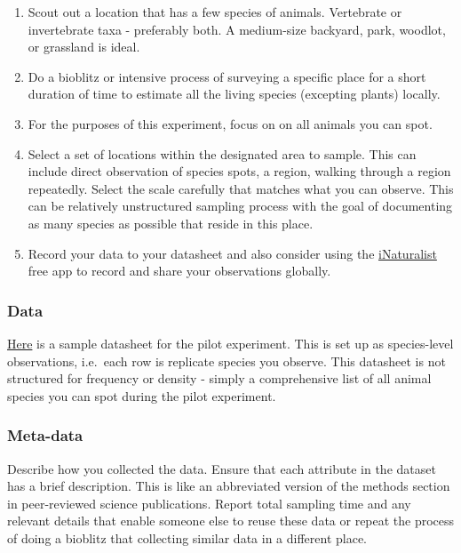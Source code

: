 \documentclass[
]{book}
\providecommand{\tightlist}{%
  \setlength{\itemsep}{0pt}\setlength{\parskip}{0pt}}
\begin{document}
\begin{enumerate}
\def\labelenumi{\arabic{enumi}.}
\tightlist
\item
  Scout out a location that has a few species of animals. Vertebrate or invertebrate taxa - preferably both. A medium-size backyard, park, woodlot, or grassland is ideal.\\
\item
  Do a bioblitz or intensive process of surveying a specific place for a short duration of time to estimate all the living species (excepting plants) locally.\\
\item
  For the purposes of this experiment, focus on on all animals you can spot.\\
\item
  Select a set of locations within the designated area to sample. This can include direct observation of species spots, a region, walking through a region repeatedly. Select the scale carefully that matches what you can observe. This can be relatively unstructured sampling process with the goal of documenting as many species as possible that reside in this place.\\
\item
  Record your data to your datasheet and also consider using the \href{https://www.inaturalist.org}{iNaturalist} free app to record and share your observations globally.
\end{enumerate}

\hypertarget{data}{%
\subsubsection*{Data}\label{data}}

\href{https://figshare.com/articles/dataset/BIOL3250_bioblitz_datasheet/12792455}{Here} is a sample datasheet for the pilot experiment. This is set up as species-level observations, i.e.~each row is replicate species you observe. This datasheet is not structured for frequency or density - simply a comprehensive list of all animal species you can spot during the pilot experiment.

\hypertarget{meta-data}{%
\subsubsection*{Meta-data}\label{meta-data}}

Describe how you collected the data. Ensure that each attribute in the dataset has a brief description. This is like an abbreviated version of the methods section in peer-reviewed science publications. Report total sampling time and any relevant details that enable someone else to reuse these data or repeat the process of doing a bioblitz that collecting similar data in a different place.
\end{document}
